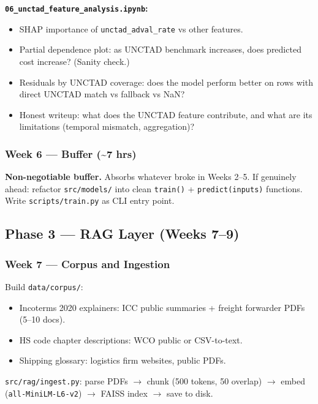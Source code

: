 \documentclass[11pt, a4paper]{article}
\begin{document}
\textbf{\texttt{06\_unctad\_feature\_analysis.ipynb}:}
\begin{itemize}[noitemsep]
  \item SHAP importance of \texttt{unctad\_adval\_rate} vs other features.
  \item Partial dependence plot: as UNCTAD benchmark increases, does predicted cost increase? (Sanity check.)
  \item Residuals by UNCTAD coverage: does the model perform better on rows with direct UNCTAD match vs fallback vs NaN?
  \item Honest writeup: what does the UNCTAD feature contribute, and what are its limitations (temporal mismatch, aggregation)?
\end{itemize}

\subsubsection*{Week 6 --- Buffer (\textasciitilde{}7 hrs)}

\begin{warnbox}
\textbf{Non-negotiable buffer.} Absorbs whatever broke in Weeks 2--5. If genuinely ahead: refactor \texttt{src/models/} into clean \texttt{train()} + \texttt{predict(inputs)} functions. Write \texttt{scripts/train.py} as CLI entry point.
\end{warnbox}

\subsection{Phase 3 --- RAG Layer (Weeks 7--9)}

\subsubsection*{Week 7 --- Corpus and Ingestion}

Build \texttt{data/corpus/}:
\begin{itemize}[noitemsep]
  \item Incoterms 2020 explainers: ICC public summaries + freight forwarder PDFs (5--10 docs).
  \item HS code chapter descriptions: WCO public or CSV-to-text.
  \item Shipping glossary: logistics firm websites, public PDFs.
\end{itemize}

\texttt{src/rag/ingest.py}: parse PDFs $\rightarrow$ chunk (500 tokens, 50 overlap) $\rightarrow$ embed (\texttt{all-MiniLM-L6-v2}) $\rightarrow$ FAISS index $\rightarrow$ save to disk.
\end{document}
